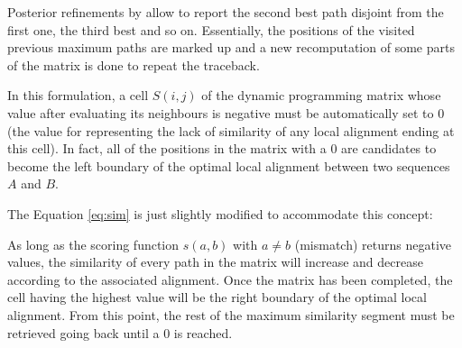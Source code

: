 Posterior refinements by \citet{waterman:1987a} allow to report the second best path disjoint from the 
first one, the third best and so on. Essentially, the positions of the visited previous maximum paths are 
marked up and a new recomputation of some parts of the matrix is done to repeat the traceback.


In this formulation, a cell $S(i,j)$ of the dynamic programming matrix whose value after evaluating its neighbours
is negative must be automatically set to $0$ (the value for representing the lack of similarity of any local
alignment ending at this cell). In fact, all of the positions in the matrix with a $0$ are candidates to become
the left boundary of the optimal local alignment between two sequences $A$ and $B$.

The Equation \ref{eq:sim} is just slightly modified to accommodate this concept:

\begin{center}
\end{center}

As long as the scoring function $s(a,b)$ with $a \neq b$ (mismatch) returns negative values, the similarity of every
path in the matrix will increase and decrease according to the associated alignment. Once the matrix has 
been completed, the cell having the highest value will be the right boundary of the optimal local alignment. 
From this point, the rest of the maximum similarity segment must be retrieved going back until a $0$ is reached.

